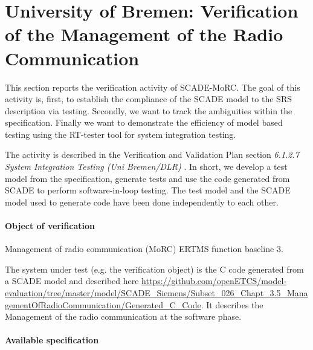 
\newcommand{\tbi}[1]{$<$\textit{#1}$>$}

\newcommand{\nl}{\mbox{}\\}
\newcommand{\nlskip}[1]{\mbox{}\\[#1]}

%
\newcommand{\cmmnt}[1]{\framebox{#1}}
\newcommand{\bgcmmnt}[1]{\nl\framebox{\parbox{.95\textwidth}{#1}}\nl[2mm]}
%

\newcommand{\eod}{\nl\rule{.95\textwidth}{1pt}\nl\textit{End of Document}}


\section{University of Bremen: Verification of the  Management of the Radio
Communication}
\label{sec:ubremen}
This section reports the verification activity of SCADE-MoRC. The goal
of this activity is, first, to establish the compliance of the SCADE
model to the SRS description via testing. Secondly, we want to track
the ambiguities within the specification. Finally we want to
demonstrate the efficiency of model based testing using the RT-tester
tool for system integration testing.

The activity is described in the Verification and Validation Plan
section {\em 6.1.2.7 System Integration Testing (Uni Bremen/DLR)} \cite{D4.1_2013}.
In short, we develop a test model from the specification, generate tests and use
the code generated from SCADE to perform software-in-loop testing.
The test model and the SCADE model used to generate code have been
done independently to each other. 

\paragraph{Object of verification}
 Management of radio communication (MoRC) ERTMS function baseline 3.


The system under test (e.g. the verification object) is the C code
generated from a SCADE model and described here
\url{https://github.com/openETCS/model-evaluation/tree/master/model/SCADE_Siemens/Subset_026_Chapt_3.5_ManagementOfRadioCommunication/Generated_C_Code}.
It describes the Management of the radio communication at the software
phase.




\paragraph{Available specification}

